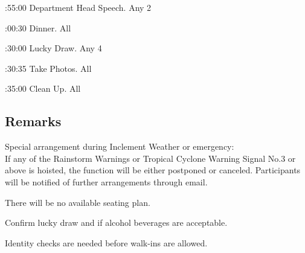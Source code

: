 \bTR{}:55:00
\eTD\bTD Department Head Speech.
\eTD\bTD Any 2
\eTD\eTR

\bTR{}:00:30
\eTD\bTD Dinner.
\eTD\bTD All
\eTD\eTR

\bTR{}:30:00
\eTD\bTD Lucky Draw.
\eTD\bTD Any 4
\eTD\eTR

\bTR{}:30:35
\eTD\bTD Take Photos.
\eTD\bTD All
\eTD\eTR

\bTR{}:35:00
\eTD\bTD Clean Up.
\eTD\bTD All
\eTD\eTR

\eTABLEbody
\eTABLE

\subsection{Remarks}
\startitemize
\item Special arrangement during Inclement Weather or emergency: \\
If any of the Rainstorm Warnings or Tropical Cyclone Warning Signal No.3 or above is hoisted, the function will be either postponed or canceled. Participants will be notified of further arrangements through email.
\item There will be no available seating plan.
\item Confirm lucky draw and if alcohol beverages are acceptable.
\item Identity checks are needed before walk-ins are allowed.
\stopitemize

\stopsection
\pagebreak
